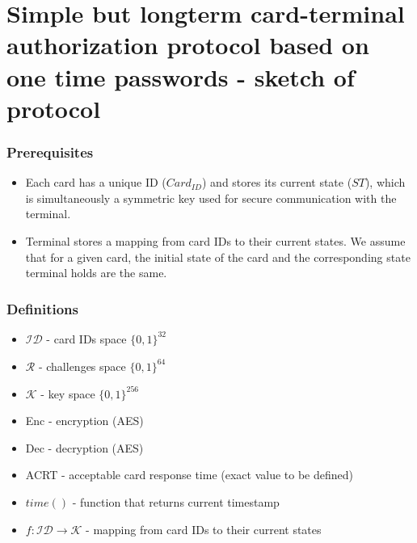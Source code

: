 \documentclass[10pt,titlepage]{article}
\begin{document}
\section*{Simple but longterm card-terminal authorization protocol based on one time passwords - sketch of protocol}

\subsubsection*{Prerequisites}

\begin{itemize}
	\item  Each card has a unique ID ($Card_{ID}$) and stores its current state ($ST$), which is simultaneously a symmetric key used for secure communication with the terminal.
	\item Terminal stores a mapping from card IDs to their current states. We assume that for a given card, the initial state of the card and the corresponding state terminal holds are the same.
\end{itemize}

\subsubsection*{Definitions}

\begin{itemize}
	\item $\mathcal{ID}$  - card IDs space $\{0,1\}^{32}$
	\item $\mathcal{R}$   - challenges space $\{0,1\}^{64}$
	\item $\mathcal{K}$   - key space $\{0,1\}^{256}$
	\item Enc - encryption (AES)
	\item Dec - decryption (AES)
	\item ACRT - acceptable card response time (exact value to be defined)
	\item $time()$ - function that returns current timestamp
	\item $f : \mathcal{ID} \rightarrow \mathcal{K}$ - mapping from card IDs to their current states
\end{itemize}
\end{document}
